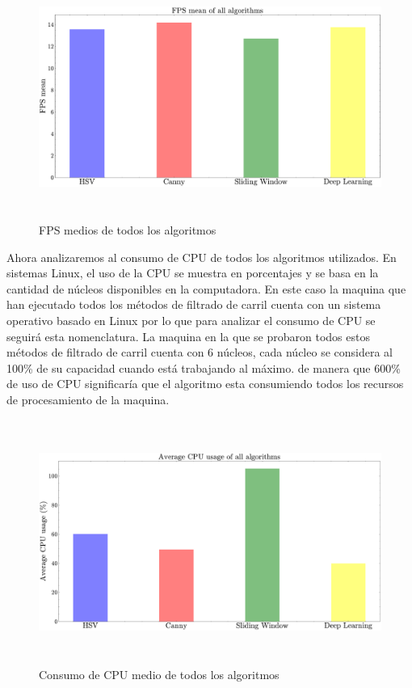 \begin{figure}[h]
    \centering
    \includegraphics[height=8cm]{imagenes/cap4/graphics_comparison/fps.pdf}
    \caption{FPS medios de todos los algoritmos}
    \label{fig:Gráfíca de comparación de los FPS de todos los algoritmos}
\end{figure}
\bigskip 


Ahora analizaremos al consumo de \ac{CPU} de todos los algoritmos utilizados. En sistemas Linux, el uso de la \ac{CPU} se muestra en porcentajes y se basa en la cantidad de núcleos disponibles en la computadora. En este caso la maquina que han ejecutado todos los métodos de filtrado de carril cuenta con un sistema operativo basado en Linux por lo que para analizar el consumo de \ac{CPU} se seguirá esta nomenclatura. La maquina en la que se probaron todos estos métodos de filtrado de carril cuenta con 6 núcleos, cada núcleo se considera al 100\% de su capacidad cuando está trabajando al máximo. de manera que 600\% de uso de \ac{CPU} significaría que el algoritmo esta consumiendo todos los recursos de procesamiento de la maquina.

\bigskip
\begin{figure}[h]
    \centering
    \includegraphics[height=8cm]{imagenes/cap4/graphics_comparison/cpu.pdf}
    \caption{Consumo de CPU medio de todos los algoritmos}
    \label{fig:Gráfíca de comparación del consumo de CPU de todos los algoritmos}
\end{figure}

